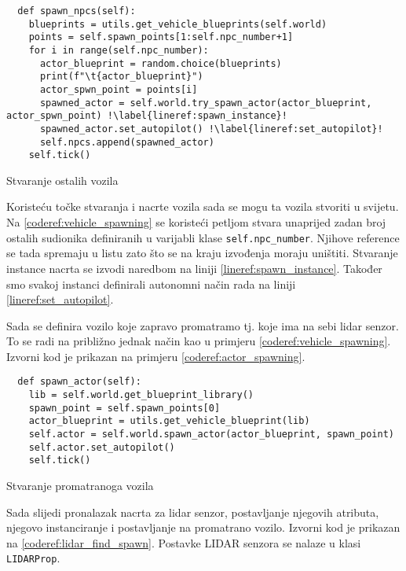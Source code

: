 \begin{listing}[h!]
  \begin{verbatim}
  def spawn_npcs(self):
    blueprints = utils.get_vehicle_blueprints(self.world)
    points = self.spawn_points[1:self.npc_number+1]
    for i in range(self.npc_number):
      actor_blueprint = random.choice(blueprints)
      print(f"\t{actor_blueprint}")
      actor_spwn_point = points[i]
      spawned_actor = self.world.try_spawn_actor(actor_blueprint, actor_spwn_point) !\label{lineref:spawn_instance}!
      spawned_actor.set_autopilot() !\label{lineref:set_autopilot}!
      self.npcs.append(spawned_actor)
    self.tick()
  \end{verbatim}
  \caption{Stvaranje ostalih vozila}
  \label{coderef:vehicle_spawning}
\end{listing}

Koristeću točke stvaranja i nacrte vozila sada se mogu ta vozila stvoriti u svijetu. Na \ref{coderef:vehicle_spawning} se koristeći petljom stvara unaprijed zadan broj ostalih sudionika definiranih u varijabli klase \texttt{self.npc_number}. Njihove reference se tada spremaju u listu zato što se na kraju izvođenja moraju uništiti. Stvaranje instance nacrta se izvodi naredbom na liniji \ref{lineref:spawn_instance}. Također smo svakoj instanci definirali autonomni način rada na liniji \ref{lineref:set_autopilot}.

Sada se definira vozilo koje zapravo promatramo tj. koje ima na sebi lidar senzor. To se radi na približno jednak način kao u primjeru \ref{coderef:vehicle_spawning}. Izvorni kod je prikazan na primjeru \ref{coderef:actor_spawning}.


\begin{listing}[h!]
  \begin{verbatim}
  def spawn_actor(self):
    lib = self.world.get_blueprint_library()
    spawn_point = self.spawn_points[0]
    actor_blueprint = utils.get_vehicle_blueprint(lib)
    self.actor = self.world.spawn_actor(actor_blueprint, spawn_point)
    self.actor.set_autopilot()
    self.tick()
  \end{verbatim}
  \caption{Stvaranje promatranoga vozila}
  \label{coderef:actor_spawning}
\end{listing}

Sada slijedi pronalazak nacrta za lidar senzor, postavljanje njegovih atributa, njegovo instanciranje i postavljanje na promatrano vozilo. Izvorni kod je prikazan na \ref{coderef:lidar_find_spawn}. Postavke LIDAR senzora se nalaze u klasi \texttt{LIDARProp}.


